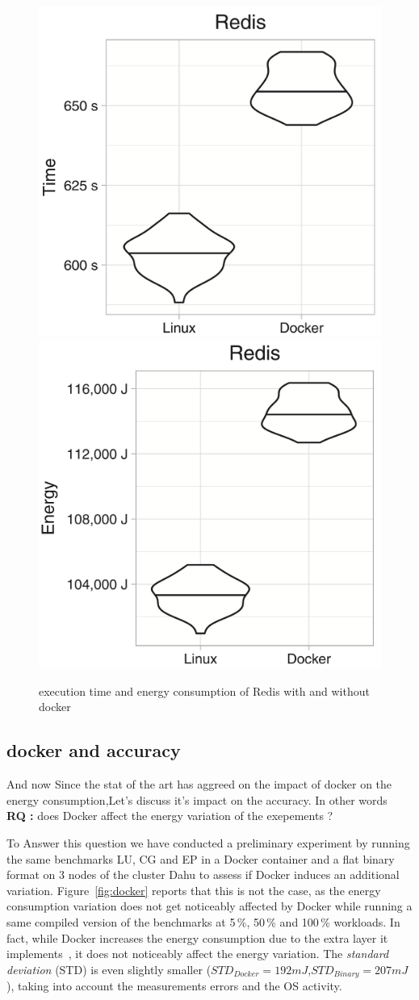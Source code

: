 \begin{figure}
    \includegraphics[width=.5\linewidth]{imgs/docker_vs_vm_energy_paper/reddis_time}
    \includegraphics[width=.5\linewidth]{imgs/docker_vs_vm_energy_paper/reddis_energy}
    \caption{execution time and energy consumption of Redis  with and without docker \cite{santos2018does}}\label{fig:docker_reddis}
\end{figure}


\subsection{docker and accuracy}
And now Since the stat of the art has aggreed on the impact of docker on the energy consumption,Let's discuss it's impact on the accuracy. In other words\\
\textbf{RQ :} does Docker affect the energy variation of the exepements ?

To Answer this question we have conducted a preliminary experiment by running the same benchmarks \textsf{LU}, \textsf{CG} and \textsf{EP} in a Docker container and a flat binary format on 3 nodes of the cluster \textsf{Dahu} to assess if Docker induces an additional variation.
Figure~\ref{fig:docker} reports that this is not the case, as the energy consumption variation does not get noticeably affected by Docker while running a same compiled version of the benchmarks at 5\,\%, 50\,\% and 100\,\% workloads.
In fact, while Docker increases the energy consumption due to the extra layer it implements~\cite{eddie_antonio_santos_how}, it does not noticeably affect the energy variation.
The \emph{standard deviation} (STD) is even slightly smaller ($STD_{Docker}=192 mJ$,$STD_{Binary}=207 mJ$), taking into account the measurements errors and the OS activity.

